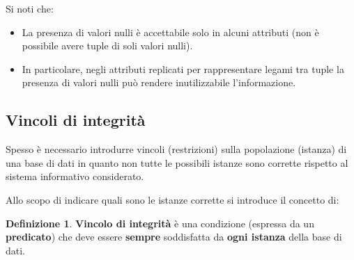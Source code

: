\documentclass[a4paper, 10pt]{article}
\theoremstyle{definition}
\newtheorem*{defn}{Definizione}
\begin{document}
		Si noti che:
		\begin{itemize}
			\item La presenza di valori nulli è accettabile solo in
			alcuni attributi (non è possibile avere tuple di soli
			valori nulli).
			\item In particolare, negli attributi replicati per
			rappresentare legami tra tuple la presenza di valori
			nulli può rendere inutilizzabile l'informazione.
		\end{itemize}
		
		\newpage
		
		\subsection{Vincoli di integrità}
		
			Spesso è necessario introdurre vincoli (restrizioni)
			sulla popolazione (istanza) di una base di dati in
			quanto non tutte le possibili istanze sono corrette
			rispetto al sistema informativo considerato.
			
			Allo scopo di indicare quali sono le istanze corrette si
			introduce il concetto di:
			\begin{defn}
				\textbf{Vincolo di integrità}
				è una condizione (espressa da un \textbf{predicato})
				che deve essere \textbf{sempre} soddisfatta
				da \textbf{ogni istanza} della base di dati.
			\end{defn}
			
\end{document}
